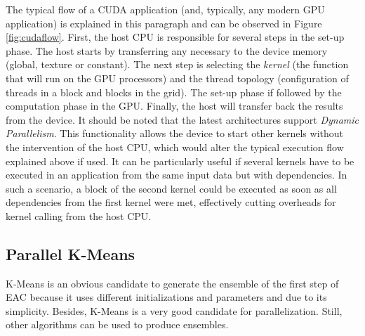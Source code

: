 The typical flow of a CUDA application (and, typically, any modern GPU application) is explained in this paragraph and can be observed in Figure \ref{fig:cudaflow}.
First, the host CPU is responsible for several steps in the set-up phase.
The host starts by transferring any necessary to the device memory (global, texture or constant).
The next step is selecting the \emph{kernel} (the function that will run on the GPU processors) and the thread topology (configuration of threads in a block and blocks in the grid).
The set-up phase if followed by the computation phase in the GPU.
Finally, the host will transfer back the results from the device.
It should be noted that the latest architectures support \emph{Dynamic Parallelism}.
This functionality allows the device to start other kernels without the intervention of the host CPU, which would alter the typical execution flow explained above if used.
It can be particularly useful if several kernels have to be executed in an application from the same input data but with dependencies.
In such a scenario, a block of the second kernel could be executed as soon as all dependencies from the first kernel were met, effectively cutting overheads for kernel calling from the host CPU.


\subsection{Parallel K-Means}
\label{sec:parallel kmeans}

K-Means is an obvious candidate to generate the ensemble of the first step of EAC because it uses different initializations and parameters and due to its simplicity.
Besides, K-Means is a very good candidate for parallelization.
Still, other algorithms can be used to produce ensembles.


